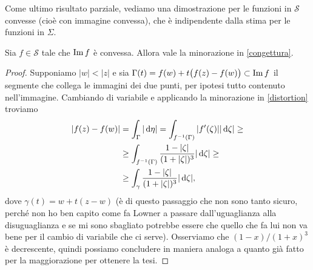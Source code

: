 Come ultimo risultato parziale, vediamo una dimostrazione per le funzioni in $\mathcal{S}$ convesse (cioè con immagine convessa), che è indipendente dalla stima per le funzioni in $\Sigma$.
\begin{prop}
  Sia $f \in \mathcal{S}$ tale che $\operatorname{Im}{f}$ è convessa. Allora vale la minorazione in \eqref{congettura}.
\end{prop}
\begin{proof}
  Supponiamo $|w|<|z|$ e sia $\Gamma(t)=f(w)+t\big(f(z)-f(w)\big) \subset \operatorname{Im}{f}$ il segmente che collega le immagini dei due punti, per ipotesi tutto contenuto nell'immagine. Cambiando di variabile e applicando la minorazione in \eqref{distortion} troviamo
  \begin{align*}
    |f(z)-f(w)|&=\int_{\Gamma} |\mathop{}\!\mathrm{d}\eta|=\int_{f^{-1}(\Gamma)} |f'(\zeta)||\mathop{}\!\mathrm{d}\zeta| \ge \\
    &\ge \int_{f^{-1}(\Gamma)} \frac{1-|\zeta|}{(1+|\zeta|)^3}|\mathop{}\!\mathrm{d}\zeta| \ge \\
    &\ge \int_\gamma \frac{1-|\zeta|}{(1+|\zeta|)^3}|\mathop{}\!\mathrm{d}\zeta|,
  \end{align*}
  dove $\gamma(t)=w+t(z-w)$ (è di questo passaggio che non sono tanto sicuro, perché non ho ben capito come fa Lowner a passare dall'uguaglianza alla disuguaglianza e se mi sono sbagliato potrebbe essere che quello che fa lui non va bene per il cambio di variabile che ci serve). Osserviamo che $(1-x)/(1+x)^3$ è decrescente, quindi possiamo concludere in maniera analoga a quanto già fatto per la maggiorazione per ottenere la tesi.
\end{proof}
